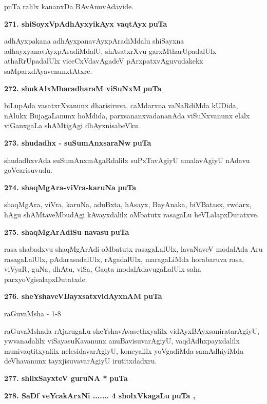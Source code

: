 \smallskip
puTa \pageref{38}ralilx kananxDa BAvAnuvAdavide.

\eject

\noindent
\textbf{271. shiSoyxVpAdhAyxyikAyx vaqtAyx} \hfill{\bf puTa \pageref{105}}

\smallskip
adhAyxpakana adhAyxpanavAyxpAradiMdalu shiSayxna adhayxyanavAyxpAradiMdalU, shAsatxrXvu garxMtharUpadalUlx athaRrUpadalUlx viceCxVdavAgadeV pArxpatxvAguvudakekx saMparxdAyavenunxtAtxre.

\medskip
\noindent
\textbf{272. shukAlxMbaradharaM viSuNxM} \hfill{\bf puTa \pageref{207}}

\smallskip
biLupAda vasatxrXvanunx dharisiruva, caMdarxna vaNaRdiMda kUDida, nAlukx BujagaLanunx hoMdida, parxsananxvadananAda viSuNxvanunx elalx viGanxgaLa shAMtigAgi dhAyxnisabeVku.

\medskip
\noindent
\textbf{273. shudadhx - suSumAnxsaraNw} \hfill{\bf puTa \pageref{157e}}

\smallskip
shudadhxvAda suSumAnxmAgaRdalilx suPxTavAgiyU amalavAgiyU nAdavu goVcarisuvudu.

\medskip
\noindent
\textbf{274. shaqMgAra-viVra-karuNa} \hfill{\bf puTa \pageref{230a}}

\smallskip
shaqMgAra, viVra, karuNa, aduBxta, hAsayx, BayAnaka, biVBatasx, rwdarx, hAgu shAMtaveMbudAgi kAvayxdalilx oMbatutx rasagaLu heVLalapxDutatxve.

\medskip
\noindent
\textbf{275. shaqMgArAdiSu navasu} \hfill{\bf puTa \pageref{218}}

\smallskip
rasa shabadxvu shaqMgArAdi oMbatutx rasagaLalUlx, lavaNaveV modalAda Aru rasagaLalUlx, pAdarasadalUlx, rAgadalUlx, maragaLiMda horabaruva rasa, viVyaR, guNa, dhAtu, viSa, Gaqta modalAdavugaLalUlx saha parxyoVgisalapxDutatxde.

\smallskip
\noindent
\textbf{276. sheYshaveVBayxsatxvidAyxnAM} \hfill{\bf puTa \pageref{28}}

\hfill{raGuvaMsha - 1-8}

raGuvaMshada rAjarugaLu sheYshavAvasethxyalilx vidAyxBAyxsaniratarAgiyU, ywvanadalilx viSayasuKavanunx anuBavisuvarAgiyU, vaqdAdhxpayxdalilx munivaqtitxyalilx nelesidavarAgiyU, koneyalilx yoVgadiMda-samAdhiyiMda deVhavanunx tayxjisuvavarAgiyU irutitxdadxru.

\medskip
\noindent
\textbf{277. shilxSayxteV guruNA *} \hfill{\bf puTa \pageref{190a}}


\medskip
\noindent
\textbf{278. SaDf veYcakArxNi ....... 4 sholxVkagaLu} \hfill{\bf puTa \pageref{154a}, \pageref{155}}

